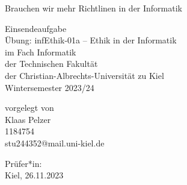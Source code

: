 \begin{titlepage}
    \begin{center}
        {\huge Brauchen wir mehr Richtlinen in der Informatik\\}
        \vspace{1.5cm}
        \begin{Large}

            Einsendeaufgabe\\
            Übung: infEthik-01a – Ethik in der Informatik\\
            im Fach Informatik\\
            der Technischen Fakultät\\
            der Christian-Albrechts-Universität zu Kiel\\
            Wintersemester 2023/24\\
        \end{Large}
        \vspace{5.0cm}

        vorgelegt von\\
        Klaas Pelzer\\
        1184754\\
        stu244352@mail.uni-kiel.de\\
    \end{center}

    \vfill
    Prüfer*in:\\
    Kiel, 26.11.2023
\end{titlepage}
